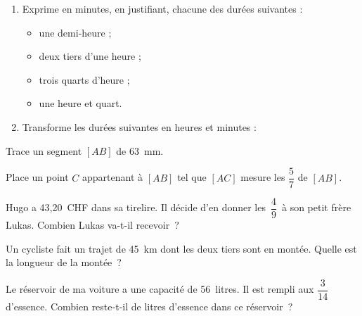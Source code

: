 \begin{exercice}
\begin{enumerate}
 \item Exprime en minutes, en justifiant, chacune des durées suivantes :
 \begin{itemize}
  \item une demi‑heure ;
  \item deux tiers d'une heure ;
  \item trois quarts d'heure ;
  \item une heure et quart.
  \end{itemize}
 \item Transforme les durées suivantes en heures et minutes :
 \end{enumerate}
\end{exercice}


\begin{exercice}
Trace un segment $[AB]$ de 63 mm.

Place un point $C$ appartenant à $[AB]$ tel que $[AC]$ mesure les $\dfrac{5}{7}$ de $[AB]$.
\end{exercice}


\begin{exercice}[Le partage]
Hugo a 43,20 CHF dans sa tirelire. Il décide d'en donner les $\dfrac{4}{9}$ à son petit frère Lukas. Combien Lukas va-t-il recevoir ?
\end{exercice}


\begin{exercice}[Le cycliste]
Un cycliste fait un trajet de 45 km dont les deux tiers sont en montée. Quelle est la longueur de la montée ?
\end{exercice}


\begin{exercice}[Le réservoir]
Le réservoir de ma voiture a une capacité de 56 litres. Il est rempli aux $\dfrac{3}{14}$ d'essence. Combien reste‑t‑il de litres d'essence dans ce réservoir ?
\end{exercice}


